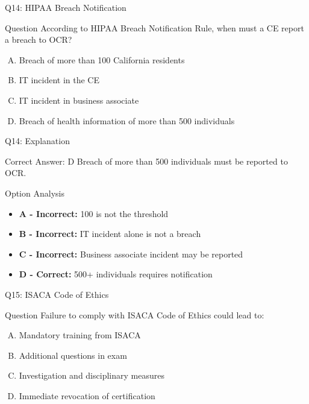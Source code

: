 \documentclass{beamer}
\begin{document}
	\begin{frame}{Q14: HIPAA Breach Notification}
		\begin{block}{Question}
			According to HIPAA Breach Notification Rule, when must a CE report a breach to OCR?
		\end{block}
		\begin{enumerate}[(A)]
			\item Breach of more than 100 California residents
			\item IT incident in the CE
			\item IT incident in business associate
			\item Breach of health information of more than 500 individuals
		\end{enumerate}
	\end{frame}
	
	\begin{frame}{Q14: Explanation}
		\begin{block}{Correct Answer: D}
			Breach of more than 500 individuals must be reported to OCR.
		\end{block}
		\begin{block}{Option Analysis}
			\begin{itemize}
				\item \textbf{A - Incorrect:} 100 is not the threshold
				\item \textbf{B - Incorrect:} IT incident alone is not a breach
				\item \textbf{C - Incorrect:} Business associate incident may be reported
				\item \textbf{D - Correct:} 500+ individuals requires notification
			\end{itemize}
		\end{block}
	\end{frame}
	
	\begin{frame}{Q15: ISACA Code of Ethics}
		\begin{block}{Question}
			Failure to comply with ISACA Code of Ethics could lead to:
		\end{block}
		\begin{enumerate}[(A)]
			\item Mandatory training from ISACA
			\item Additional questions in exam
			\item Investigation and disciplinary measures
			\item Immediate revocation of certification
		\end{enumerate}
	\end{frame}
	
\end{document}
